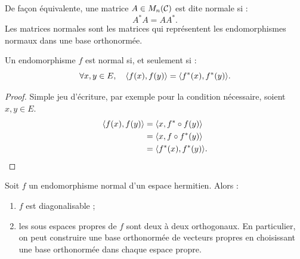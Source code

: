 \begin{rmq}
De façon équivalente, une matrice $A \in M_n(\mathcal{C})$ est dite normale si :
\[ A^{\ast} A = A A^{\ast} . \]
Les matrices normales sont les matrices qui représentent les endomorphismes normaux dans une base orthonormée.
\end{rmq}

\begin{lem}
\label{lem:2}
Un endomorphisme $f$ est normal si, et seulement si :
\[ \forall x, y \in E, \quad \langle f(x), f(y) \rangle = \langle f^{\ast}(x), f^{\ast}(y) \rangle . \] 
\end{lem}

\begin{proof}
Simple jeu d'écriture, par exemple pour la condition nécessaire, soient $x, y \in E$.
\begin{align*}
\langle f(x), f(y) \rangle & = \langle x, f^{\ast} \circ f(y) \rangle \\
& = \langle x, f \circ f^{\ast}(y) \rangle \\
& = \langle f^{\ast}(x),  f^{\ast}(y) \rangle .
\end{align*}
\end{proof}

\begin{thm}
Soit $f$ un endomorphisme normal d'un espace hermitien. Alors :
\begin{enumerate}[label=(\roman*)]
\item $f$ est diagonalisable ;
\item les sous espaces propres de $f$ sont deux à deux orthogonaux. En particulier, on peut construire une base orthonormée 
de vecteurs propres en choisissant une base orthonormée dans chaque espace propre.
\end{enumerate}
\end{thm}


